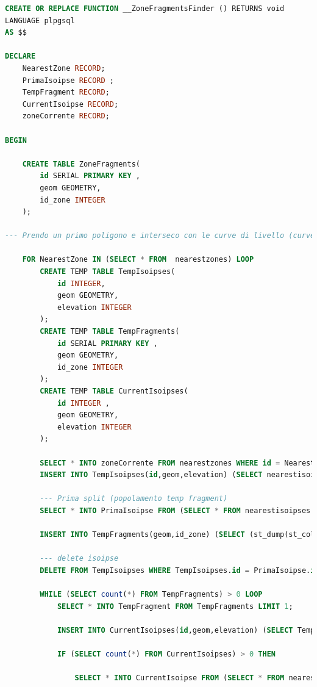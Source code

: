 \begin{lstlisting}[language=SQL]
CREATE OR REPLACE FUNCTION __ZoneFragmentsFinder () RETURNS void
LANGUAGE plpgsql
AS $$

DECLARE
	NearestZone RECORD;
	PrimaIsoipse RECORD ;
	TempFragment RECORD;
	CurrentIsoipse RECORD;
	zoneCorrente RECORD;

BEGIN

	CREATE TABLE ZoneFragments(
		id SERIAL PRIMARY KEY ,
		geom GEOMETRY,
		id_zone INTEGER
	);

--- Prendo un primo poligono e interseco con le curve di livello (curve risultanti dall'intersezione con il buffer)

	FOR NearestZone IN (SELECT * FROM  nearestzones) LOOP
		CREATE TEMP TABLE TempIsoipses(
			id INTEGER,
			geom GEOMETRY,
			elevation INTEGER
		);
		CREATE TEMP TABLE TempFragments(
			id SERIAL PRIMARY KEY ,
			geom GEOMETRY,
			id_zone INTEGER
		);
		CREATE TEMP TABLE CurrentIsoipses(
			id INTEGER ,
			geom GEOMETRY,
			elevation INTEGER
		);

		SELECT * INTO zoneCorrente FROM nearestzones WHERE id = NearestZone.id;
		INSERT INTO TempIsoipses(id,geom,elevation) (SELECT nearestisoipses.id,(st_dump(st_collectionextract(st_intersection(nearestisoipses.geom,zoneCorrente.geom),2))).geom as geom,nearestisoipses.elevation FROM nearestisoipses);

		--- Prima split (popolamento temp fragment)
		SELECT * INTO PrimaIsoipse FROM (SELECT * FROM nearestisoipses WHERE (SELECT id From TempIsoipses LIMIT 1) = nearestisoipses.id) as prima;
	
		INSERT INTO TempFragments(geom,id_zone) (SELECT (st_dump(st_collectionextract(st_split(zoneCorrente.geom,PrimaIsoipse.geom),3))).geom , zoneCorrente.id);
	
		--- delete isoipse
		DELETE FROM TempIsoipses WHERE TempIsoipses.id = PrimaIsoipse.id;
	
		WHILE (SELECT count(*) FROM TempFragments) > 0 LOOP
			SELECT * INTO TempFragment FROM TempFragments LIMIT 1;
		
			INSERT INTO CurrentIsoipses(id,geom,elevation) (SELECT TempIsoipses.id,(st_dump(st_collectionextract(st_intersection(TempIsoipses.geom,TempFragment.geom),2))).geom as geom,TempIsoipses.elevation FROM TempIsoipses);
		
			IF (SELECT count(*) FROM CurrentIsoipses) > 0 THEN
				
				SELECT * INTO CurrentIsoipse FROM (SELECT * FROM nearestisoipses WHERE (SELECT id From CurrentIsoipses LIMIT 1) = nearestisoipses.id) as currentiso;
				

\end{lstlisting}
